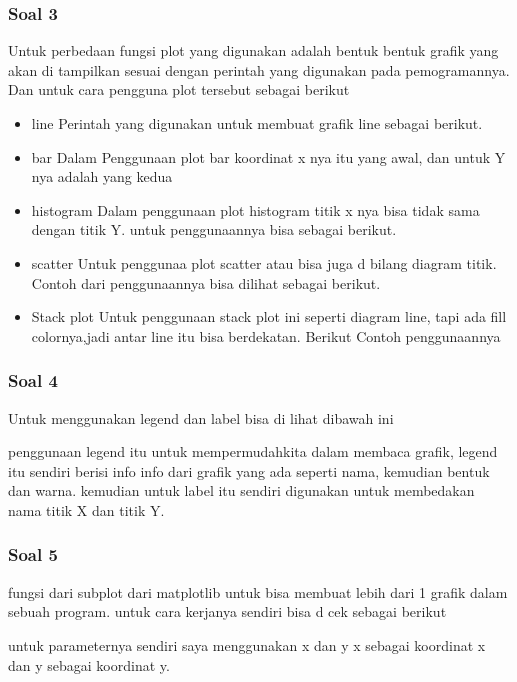 \subsubsection{Soal 3}
\hfill \break
Untuk perbedaan fungsi plot yang digunakan adalah bentuk bentuk grafik yang akan di tampilkan sesuai dengan perintah yang digunakan pada pemogramannya.
Dan untuk cara pengguna plot tersebut sebagai berikut
\begin{itemize}
    \item line
    Perintah yang digunakan untuk membuat grafik line sebagai berikut.
    
    \item bar
    Dalam Penggunaan plot bar koordinat x nya itu yang awal, dan untuk Y nya adalah yang kedua
    
    \item histogram
    Dalam penggunaan plot histogram titik x nya bisa tidak sama dengan titik Y.
    untuk penggunaannya bisa sebagai berikut.
    
    \item scatter
    Untuk penggunaa plot scatter atau bisa juga d bilang diagram titik.
    Contoh dari penggunaannya bisa dilihat sebagai berikut.
    
    \item Stack plot
    Untuk penggunaan stack plot ini seperti diagram line, tapi ada fill colornya,jadi antar line itu bisa berdekatan.
    Berikut Contoh penggunaannya
    
\end{itemize}
\subsubsection{Soal 4}
\hfill \break
Untuk menggunakan legend dan label bisa di lihat dibawah ini

penggunaan legend itu untuk mempermudahkita dalam membaca grafik, legend itu sendiri berisi info info dari grafik yang ada seperti nama, kemudian bentuk dan warna.
kemudian untuk label itu sendiri digunakan untuk membedakan nama titik X dan titik Y.
\subsubsection{Soal 5}
\hfill \break
fungsi dari subplot dari matplotlib untuk bisa membuat lebih dari 1 grafik dalam sebuah program.
untuk cara kerjanya sendiri bisa d cek sebagai berikut

untuk parameternya sendiri saya menggunakan x dan y x sebagai koordinat x dan y sebagai koordinat y.
